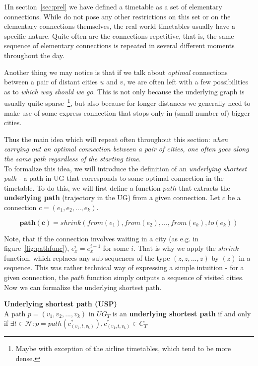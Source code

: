 1In section~\ref{sec:prel} we have defined a timetable as a set of elementary connections. While do not pose any other restrictions on this set or on the elementary connections themselves, the real world timetables usually have a specific nature. Quite often are the connections repetitive, that is, the same sequence of elementary connections is repeated in several different moments throughout the day.

Another thing we may notice is that if we talk about \textit{optimal} connections between a pair of distant cities $u$ and $v$, we are often left with a few possibilities as to \textit{which way should we go}. This is not only because the underlying graph is usually quite sparse~\footnote{Maybe with exception of the airline timetables, which tend to be more dense.}, but also because for longer distances we generally need to make use of some express connection that stops only in (small number of) bigger cities.

Thus the main idea which will repeat often throughout this section: \textit{when carrying out an optimal connection between a pair of cities, one often goes along the same path regardless of the starting time}. \\

\noindent To formalize this idea, we will introduce the definition of an \textit{underlying shortest path} - a path in UG that corresponds to some optimal connection in the timetable. To do this, we will first define a function $path$ that extracts the \textbf{underlying path} (trajectory in the UG) from a given connection. Let $c$ be a connection $c = (e_{1}, e_{2}, ..., e_{k})$.

\begin{equation*}
	\bm{path(c)} = shrink(from(e_{1}), from(e_{2}), ..., from(e_{k}), to(e_{k}))
\end{equation*}

\noindent Note, that if the connection involves waiting in a city (as e.g. in figure~\ref{fig:pathfunc}), $e_{x}^{i} = e_{x}^{i + 1}$ for some $i$. That is why we apply the $shrink$ function, which replaces any sub-sequences of the type $(z, z, ..., z)$ by $(z)$ in a sequence. This was rather technical way of expressing a simple intuition - for a given connection, the $path$ function simply outputs a sequence of visited cities. Now we can formalize the underlying shortest path.

\begin{definition}
    \textbf{Underlying shortest path (USP)} \\
	A path $p = (v_{1}, v_{2}, ..., v_{k})$ in $UG_{T}$ is an \textbf{underlying shortest path} if and only if $\exists t \in \mathcal{N}: p = path(c_{(v_{1}, t, v_{k})}^{*}), c_{(v_{1}, t, v_{k})}^{*} \in C_{T}$
\end{definition}
    
